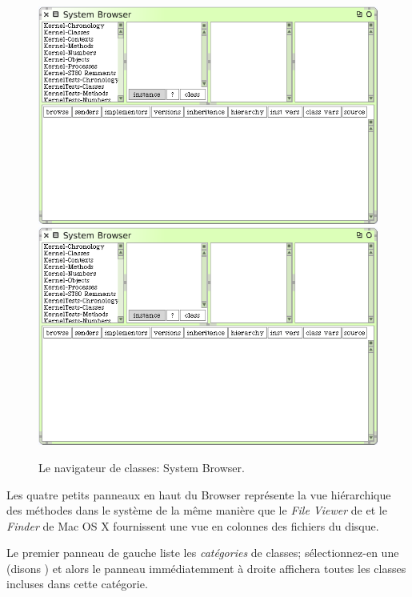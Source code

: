 \documentclass[a4paper,10pt,twoside]{book}
\begin{document}
\begin{figure}[htbp]
   \centering
   \ifluluelse
	 {\includegraphics[width=\textwidth]{SystemBrowser0} }
	 {\includegraphics[scale=.7]{SystemBrowser0} }
   \caption{Le navigateur de classes: System Browser.}
   \label{fig:SystemBrowser0}
\end{figure}

Les quatre petits panneaux en haut du Browser repr\'esente la vue
hi\'erarchique des m\'ethodes dans le syst\`eme de la m\^eme
mani\`ere que le \textit{File Viewer} de  et le
\textit{Finder} de Mac OS X fournissent une vue en colonnes 
des fichiers du disque.

Le premier panneau de gauche liste les \emph{cat\'egories} de classes;
s\'electionnez-en une (disons ) et alors le
panneau imm\'ediatemment \`a droite affichera toutes les classes incluses
dans cette cat\'egorie.
\end{document}
